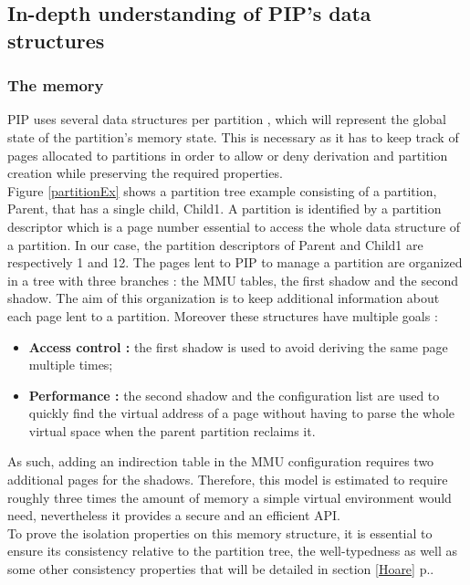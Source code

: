 
\subsection{In-depth understanding of PIP's data structures} \label{structures}

\subsubsection{The memory}

PIP uses several data structures per partition \cite{PIPKernel}, which will represent the global state of the partition's memory state. This is necessary as it has to keep track of pages allocated to partitions in order to allow or deny derivation and partition creation while preserving the required properties. \\

Figure \ref{partitionEx} shows a partition tree example consisting of a partition, Parent, that has a single child, Child1. A partition is identified by a partition descriptor which is a page number essential to access the whole data structure of a partition. In our case, the partition descriptors of Parent and Child1 are respectively 1 and 12. The pages lent to PIP to manage a partition are organized in a tree with three branches : the MMU tables, the first shadow and the second shadow. The aim of this organization is to keep additional information about each page lent to a partition. Moreover these structures have multiple goals :
\begin{itemize}
	\item \textbf{Access control :} the first shadow is used to avoid deriving the same page multiple times;
	\item \textbf{Performance :} the second shadow and the configuration list are used to quickly find the virtual address of a page without having to parse the whole virtual space when the parent partition reclaims it.
\end{itemize} 
As such, adding an indirection table in the MMU configuration requires two additional pages for the shadows. Therefore, this model is estimated to require roughly three times the amount of memory a simple virtual environment would need, nevertheless it provides a  secure and an efficient API. \\

To prove the isolation properties on this memory structure, it is essential to ensure its consistency relative to the partition tree, the well-typedness as well as some other consistency properties that will be detailed in section \ref{Hoare} p.\pageref{Hoare}.

